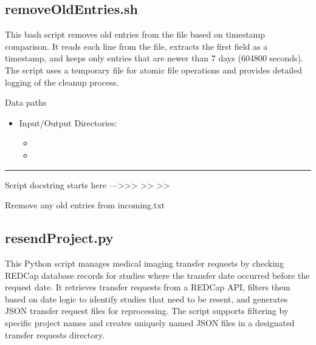 \documentclass[letterpaper,10pt,english]{sphinxmanual}
\begin{document}
\subsection{removeOldEntries.sh}
\label{\detokenize{Architecture/scripts/removeOldEntries:removeoldentries-sh}}\label{\detokenize{Architecture/scripts/removeOldEntries::doc}}
\sphinxAtStartPar
This bash script removes old entries from the  file based on timestamp comparison. It reads each line from the file, extracts the first field as a timestamp, and keeps only entries that are newer than 7 days (604800 seconds). The script uses a temporary file for atomic file operations and provides detailed logging of the cleanup process.

\sphinxAtStartPar
{}


\sphinxAtStartPar
{}


\sphinxAtStartPar
Data paths
\begin{itemize}
\item {} 
\sphinxAtStartPar
Input/Output Directories:
\begin{itemize}
\item {} 
\sphinxAtStartPar
{}

\item {} 
\sphinxAtStartPar
{}

\end{itemize}

\end{itemize}


\bigskip\hrule\bigskip


\sphinxAtStartPar
Script docstring starts here —\textgreater{}\textgreater{}\textgreater{}
\textendash{}\textgreater{}\textgreater{}
\textendash{}\textgreater{}\textgreater{}

\sphinxAtStartPar
Rremove any old entries from incoming.txt

\sphinxstepscope


\subsection{resendProject.py}
\label{\detokenize{Architecture/scripts/resendProject:resendproject-py}}\label{\detokenize{Architecture/scripts/resendProject::doc}}
\sphinxAtStartPar
This Python script manages medical imaging transfer requests by checking REDCap database records for studies where the transfer date occurred before the request date. It retrieves transfer requests from a REDCap API, filters them based on date logic to identify studies that need to be resent, and generates JSON transfer request files for reprocessing. The script supports filtering by specific project names and creates uniquely named JSON files in a designated transfer requests directory.
\end{document}
